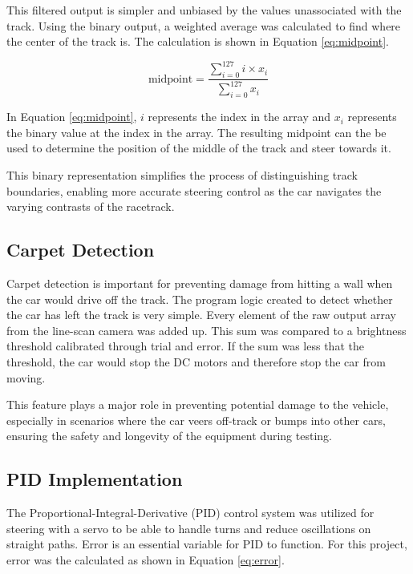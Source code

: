 \documentclass[conference]{IEEEtran}
\begin{document}
This filtered output is simpler and unbiased by the values unassociated with the track. Using the binary output, a weighted average was calculated to find where the center of the track is. The calculation is shown in Equation \ref{eq:midpoint}.

\begin{equation}
	\text{midpoint} = \frac{\sum_{i=0}^{127} i \times x_i}{\sum_{i=0}^{127} x_i}\label{eq:midpoint}
\end{equation}

In Equation \ref{eq:midpoint}, $i$ represents the index in the array and $x_i$ represents the binary value at the index in the array. The resulting midpoint can the be used to determine the position of the middle of the track and steer towards it.

This binary representation simplifies the process of distinguishing track boundaries, enabling more accurate steering control as the car navigates the varying contrasts of the racetrack.

\subsection{Carpet Detection}

Carpet detection is important for preventing damage from hitting a wall when the car would drive off the track. The program logic created to detect whether the car has left the track is very simple. Every element of the raw output array from the line-scan camera was added up. This sum was compared to a brightness threshold calibrated through trial and error. If the sum was less that the threshold, the car would stop the DC motors and therefore stop the car from moving.

This feature plays a major role in preventing potential damage to the vehicle, especially in scenarios where the car veers off-track or bumps into other cars, ensuring the safety and longevity of the equipment during testing.

\subsection{PID Implementation}


The Proportional-Integral-Derivative (PID) control system was utilized for steering with a servo to be able to handle turns and reduce oscillations on straight paths. Error is an essential variable for PID to function. For this project, error was the calculated as shown in Equation \ref{eq:error}.
\end{document}

